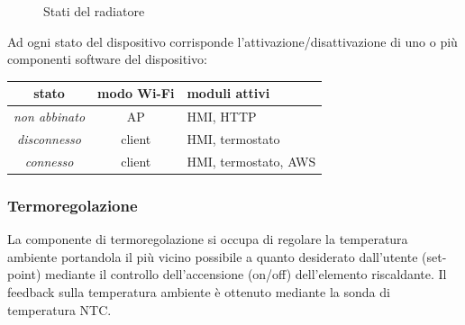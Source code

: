 \documentclass[a4paper,titlepage]{article}
\begin{document}
\begin{figure}[ht]
    \centering
    \caption{Stati del radiatore}
    \label{stati}
\end{figure}

Ad ogni stato del dispositivo corrisponde l'attivazione/disattivazione di uno o più
componenti software del dispositivo:

\begin{center}
\begin{tabular}{| c | c | l |}
    \hline
    stato & modo Wi-Fi & moduli attivi \\
    \hline
    \textit{non abbinato} & AP & HMI, HTTP \\
    \hline
    \textit{disconnesso} & client & HMI, termostato \\
    \hline
    \textit{connesso} & client & HMI, termostato, AWS \\
    \hline
\end{tabular}
\end{center}

\subsubsection{Termoregolazione}

La componente di termoregolazione si occupa di regolare la temperatura ambiente portandola
il più vicino possibile a quanto desiderato dall'utente (set-point) mediante
il controllo dell'accensione (on/off) dell'elemento riscaldante. Il feedback sulla
temperatura ambiente è ottenuto mediante la sonda di temperatura NTC.
\end{document}
